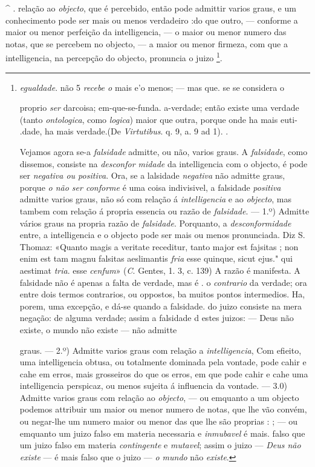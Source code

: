 \textasciicircum{} . relação ao \emph{objecto}, que é percebido, então pode admittir varios graus, e um conhecimento pode ser mais ou menos verdadeiro :do que outro, --- conforme a maior ou menor perfeição da intelligencia, --- o maior ou menor numero das notas, que se percebem no objecto, --- a maior ou menor firmeza, com que a intelligencia, na percepção do objecto, pronuncia o juizo \footnote{\emph{egualdade}. não 5 \emph{recebe o} mais e'o menos; --- mas que. se se considera o\par proprio \emph{ser} darcoisa; em-que-se-funda. a-verdade; então existe uma verdade \textbar{} (tanto \emph{ontologica}, como \emph{logica}) maior que outra, porque onde ha mais euti- .dade, ha mais verdade.(De \emph{Virtutibus}. q. 9, a. 9 ad 1). .\par Vejamos agora se-a \emph{falsidade} admitte, ou não, varios graus. A \emph{falsidade}, como dissemos, consiste na \emph{desconfor midade} da intelligencia com o objecto, é pode ser \emph{negativa ou positiva}. Ora, se a lalsidade \emph{negativa} não admitte graus, porque \emph{o não ser conforme} é uma coisa indivisivel, a falsidade \emph{positiva} admitte varios graus, não só com relação á \emph{intelligencia} e ao \emph{objecto}, mas tambem com relação á propria essencia ou razão de \emph{falsidade}. --- 1.º) Admitte vários graus na propria razão de \emph{falsidade}. Porquanto, a \emph{desconformidade} entre, a intelligencia e o objecto pode ser mais ou menos pronunciada. Diz S. Thomaz: «Quanto magis a veritate receditur, tanto major est fajsitas ; non enim est tam magnu falsitas aeslimantis \emph{fria} esse quinque, sicut ejus." qui aestimat \emph{tria}. esse \emph{cenfum}» (\emph{C}. Gentes, 1. 3, c. 139) A razão é manifesta. A falsidade não é apenas a falta de verdade, mas é . o \emph{contrario} da verdade; ora entre dois termos contrarios, ou oppostos, ba muitos pontos intermedios. Ha, porem, uma excepção, e dá-se quando a falsidade. do juizo consiste na mera negação: de alguma verdade; assim a falsidade d estes juizos: --- Deus não existe, o mundo não existe --- não admitte\par graus. --- 2.º) Admitte varios graus com relação a \emph{intelligencia}, Com efieito, uma intelligencia obtusa, ou totalmente dominada pela vontade, pode cahir e cahe em erros, mais grosseiros do que os erros, em que pode cahir e cahe uma intelligencia perspicaz, ou menos sujeita á influencia da vontade. --- 3.0) Admitte varios graus com relação ao \emph{objecto}, --- ou emquanto a um objecto podemos attribuir um maior ou menor numero de notas, que lhe vão convém, ou negar-lhe um numero maior ou menor das que lhe são proprias : ; --- ou emquanto um juizo falso em materia necessaria e \emph{inmubavel} é mais. falso que um juizo falso em materia \emph{contingente} e \emph{mutavel}; assim o juizo --- \emph{Deus não existe} --- é mais falso que o juizo --- \emph{o mundo} não \emph{existe}.}.

